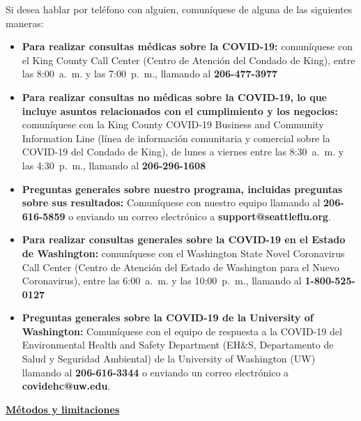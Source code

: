 \documentclass[10pt]{article}
\begin{document}
Si desea hablar por teléfono con alguien, comuníquese de alguna de las
siguientes maneras: 

\begin{itemize}

\item

  \textbf{Para realizar consultas médicas sobre la COVID-19:} comuníquese con el
  King County Call Center (Centro de Atención del Condado de King), entre las
  8:00 a. m. y las 7:00 p. m., llamando al \textbf{206-477-3977}

\item

  \textbf{Para realizar consultas no médicas sobre la COVID-19, lo que incluye
  asuntos relacionados con el cumplimiento y los negocios:} comuníquese con la
  King County COVID-19 Business and Community Information Line (línea de
  información comunitaria y comercial sobre la COVID-19 del Condado de King), de
  lunes a viernes entre las 8:30 a. m. y las 4:30 p. m., llamando al
  \textbf{206-296-1608}

\item

  \textbf{Preguntas generales sobre nuestro programa, incluidas preguntas sobre
  sus resultados:} Comuníquese con nuestro equipo llamando al
  \textbf{206-616-5859} o enviando un correo electrónico a
  \textbf{support@seattleflu.org}.

\item

  \textbf{Para realizar consultas generales sobre la COVID-19 en el Estado de
  Washington:} comuníquese con el Washington State Novel Coronavirus Call Center
  (Centro de Atención del Estado de Washington para el Nuevo Coronavirus), entre
  las 6:00 a. m. y las 10:00 p. m., llamando al \textbf{1-800-525-0127}

\item

  \textbf{Preguntas generales sobre la COVID-19 de la University of Washington:}
  Comuníquese con el equipo de respuesta a la COVID-19 del Environmental Health
  and Safety Department (EH\&S, Departamento de Salud y Seguridad Ambiental) de
  la University of Washington (UW) llamando al \textbf{206-616-3344} o enviando
  un correo electrónico a \textbf{covidehc@uw.edu}.

\end{itemize}

\bigskip

\large \underline{\textbf{Métodos y limitaciones}}
\end{document}
